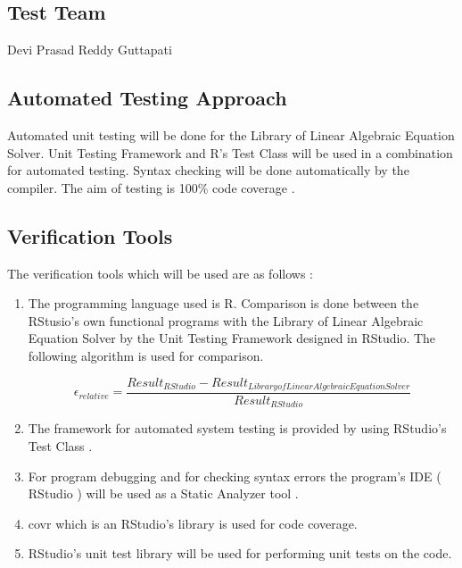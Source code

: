 \documentclass[12pt, titlepage]{article}
\begin{document}
\subsection{Test Team}

Devi Prasad Reddy Guttapati

\subsection{Automated Testing Approach}

Automated unit testing will be done for the Library of Linear Algebraic Equation
Solver. Unit Testing Framework and R's Test Class will be used in a combination
for automated testing. Syntax checking will be done automatically by the
compiler. The aim of testing is 100\%  code coverage .

\subsection{Verification Tools}

The verification tools which will be used are as follows :

\begin{enumerate}

\item The programming language used is R. Comparison is done between the
RStusio's own functional programs with the Library of Linear Algebraic Equation
Solver by the Unit Testing Framework designed in RStudio. The following
algorithm is used for comparison.


\[\epsilon_{relative} = \frac{Result_{RStudio} - Result_{Library of Linear
Algebraic Equation Solver}}{Result_{RStudio}}\]



\item The framework for automated system testing is provided by using RStudio's Test Class .

\item For program debugging and for checking syntax errors the program's IDE (
RStudio ) will be used as a Static Analyzer tool .

\item covr which is an RStudio's library is used for code coverage.

\item RStudio's unit test library will be used for performing unit tests on the code. 
\end{enumerate}
\end{document}
